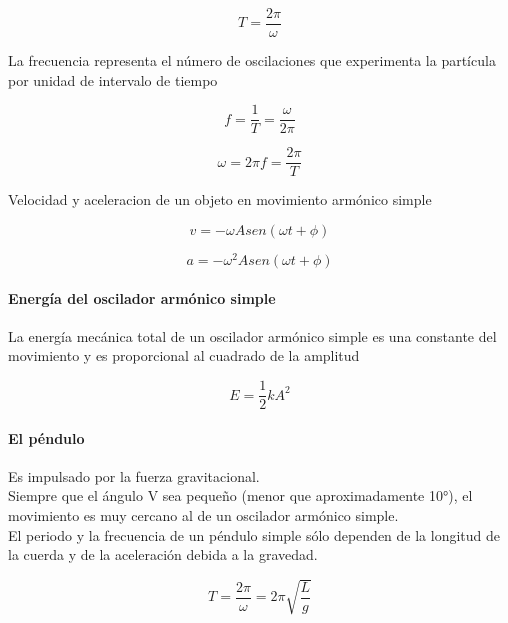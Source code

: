 \documentclass[10pt]{article}
\begin{document}
\begin{equation*}
	T = \dfrac{2\pi}{\omega}
\end{equation*}

La frecuencia representa el número de oscilaciones que experimenta la partícula por unidad de intervalo de tiempo

\begin{equation*}
	f  = \dfrac{1}{T} = \dfrac{\omega}{2\pi}
\end{equation*}

\begin{equation*}
	\omega = 2\pi f = \dfrac{2\pi}{T}
\end{equation*}

Velocidad  y aceleracion de un objeto en movimiento armónico simple

\begin{equation*}
	v = -\omega A sen(\omega t+ \phi )
\end{equation*}

\begin{equation*}
	a = -\omega^2 A sen(\omega t+ \phi )
\end{equation*}
\paragraph{Energía del oscilador armónico simple}

La energía mecánica total de un oscilador armónico simple es una constante del
movimiento y es proporcional al cuadrado de la amplitud

\begin{equation*}
	E = \frac{1}{2}k A^2
\end{equation*}

\paragraph{El péndulo}

Es impulsado por la fuerza gravitacional.\\ 
Siempre que el ángulo V sea pequeño (menor que aproximadamente 10°), el movimiento es muy cercano al de un oscilador armónico simple.\\
\linebreak
El periodo y la frecuencia de un péndulo simple sólo dependen de la longitud de la cuerda y de la aceleración debida a la gravedad. 

\begin{equation}
	T = \dfrac{2\pi}{\omega} = 2\pi \sqrt{\dfrac{L}{g}}
\end{equation}
\end{document}
